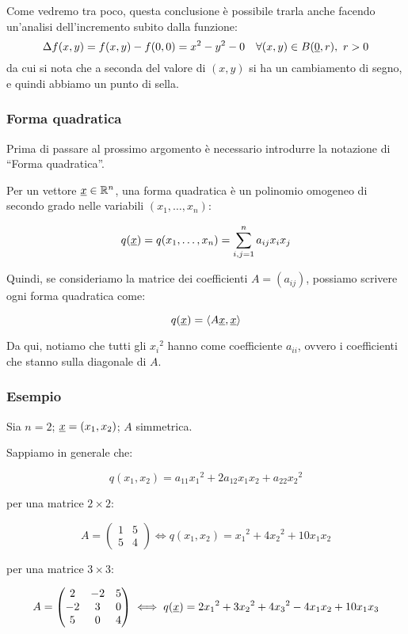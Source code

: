 Come vedremo tra poco, questa conclusione è possibile trarla anche facendo un'analisi dell'incremento subito dalla funzione:
\[
    \Delta f(x,y) = f(x,y) - f(0,0) = x^{2}-y^{2}-0 \quad\forall (x,y) \in B(\underline{0},r),\ r>0
\]
da cui si nota che a seconda del valore di \((x,y)\) si ha un cambiamento di segno, e quindi abbiamo un punto di sella.

\pagebreak
\subsubsection{Forma quadratica}

Prima di passare al prossimo argomento è necessario introdurre la notazione di ``Forma quadratica''.

Per un vettore \(\underline{x} \in \mathbb{R}^{n} \), una forma quadratica è un polinomio omogeneo di secondo grado nelle variabili \((x_1,\ldots,x_n)\):

\[
    q(\underline{x} ) = q(x_1,\ldots,x_n) = \sum^{n}_{i,j=1} a_{ij} x_i x_j
\]

Quindi, se consideriamo la matrice dei coefficienti \(A = (a_{ij})\), possiamo scrivere ogni forma quadratica come:

\[
    q(\underline{x} ) = \langle A\underline{x},\underline{x}\rangle
\]

Da qui, notiamo che tutti gli \({x_i}^{2}\) hanno come coefficiente \(a_{ii}\), ovvero i coefficienti che stanno sulla diagonale di \(A\).

\subsubsection*{Esempio}

Sia \(n=2\); \(\underline{x} =(x_1,x_2)\); \(A\) simmetrica.

Sappiamo in generale che:

\[
    q(x_1,x_2) = a_{11} {x_1}^{2} + 2a_{12} x_1 x_2 + a_{22}{x_2}^{2}
\]

per una matrice \(2\times 2\):

\[
    A= \begin{pmatrix}
        1 & 5 \\
        5 & 4
    \end{pmatrix} \iff
    q(x_1,x_2) = {x_1}^{2}+4 {x_2}^{2}+ 10 x_1 x_2
\]

per una matrice \(3\times 3\):

\[
    A = \begin{pmatrix}
        2  & -2 & 5 \\
        -2 & 3  & 0 \\
        5  & 0  & 4
    \end{pmatrix} \iff
    q(\underline{x} ) = 2 {x_1}^{2}+3 {x_2}^{2}+ 4 {x_3}^{2} - 4 x_1 x_2 + 10 x_1 x_3
\]

